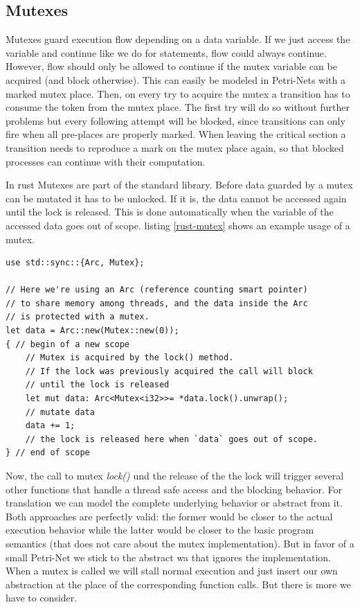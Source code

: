 \subsection*{Mutexes}
Mutexes guard execution flow depending on a data variable.
If we just access the variable and continue like we do for statements, flow could always continue.
However, flow should only be allowed to continue if the mutex variable can be acquired (and block otherwise).
This can easily be modeled in Petri-Nets with a marked mutex place.
Then, on every try to acquire the mutex a transition has to consume the token from the mutex place.
The first try will do so without further problems but every following attempt will be blocked, since transitions can only fire when all pre-places are properly marked.
When leaving the critical section a transition needs to reproduce a mark on the mutex place again, so that blocked processes can continue with their computation.

In rust Mutexes are part of the standard library.
Before data guarded by a mutex can be mutated it has to be unlocked.
If it is, the data cannot be accessed again until the lock is released.
This is done automatically when the variable of the accessed data goes out of scope.
listing \ref{rust-mutex} shows an example usage of a mutex.

\begin{lstlisting}
use std::sync::{Arc, Mutex};

// Here we're using an Arc (reference counting smart pointer)
// to share memory among threads, and the data inside the Arc
// is protected with a mutex.
let data = Arc::new(Mutex::new(0));
{ // begin of a new scope
    // Mutex is acquired by the lock() method.
    // If the lock was previously acquired the call will block
    // until the lock is released
    let mut data: Arc<Mutex<i32>>= *data.lock().unwrap();
    // mutate data
    data += 1;
    // the lock is released here when `data` goes out of scope.
} // end of scope
\end{lstlisting}

Now, the call to mutex \textit{lock()} und the release of the the lock will trigger several other functions that handle a thread safe access and the blocking behavior.
For translation we can model the complete underlying behavior or abstract from it.
Both approaches are perfectly valid: the former would be closer to the actual execution behavior while the latter would be closer to the basic program semantics (that does not care about the mutex implementation).
But in favor of a small Petri-Net we stick to the abstract wa that ignores the implementation.
When a mutex is called we will stall normal execution and just insert our own abstraction at the place of the corresponding function calls.
But there is more we have to consider.

